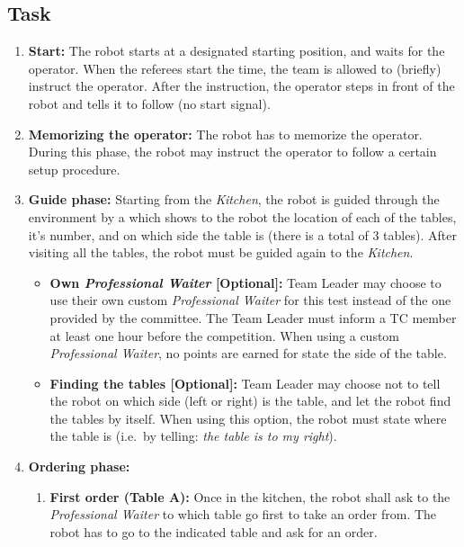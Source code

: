 \subsection{Task}
\begin{enumerate}
	\item \textbf{Start:} The robot starts at a designated starting position, and waits for the  operator. When the referees start the time, the team is allowed to (briefly) instruct the operator. After the instruction, the operator steps in front of the robot and tells it to follow (no start signal).

	\item \textbf{Memorizing the operator:} The robot has to memorize the operator. During this phase, the robot may instruct the operator to follow a certain setup procedure.

	\item \textbf{Guide phase:} Starting from the \textit{Kitchen}, the robot is guided through the environment by a  which shows to the robot the location of each of the tables, it's number, and on which side the table is (there is a total of 3 tables). After visiting all the tables, the robot must be guided again to the \textit{Kitchen}.
	\begin{itemize}
		\item \textbf{Own \textit{Professional Waiter} [Optional]:} Team Leader may choose to use their own custom \textit{Professional Waiter} for this test instead of the one provided by the committee. The Team Leader must inform a TC member at least one hour before the competition. When using a custom \textit{Professional Waiter}, no points are earned for state the side of the table.
		\item \textbf{Finding the tables [Optional]:} Team Leader may choose not to tell the robot on which side (left or right) is the table, and let the robot find the tables by itself. When using this option, the robot must state where the table is (i.e.~by telling: \textit{the table is to my right}).
	\end{itemize}

	\item \textbf{Ordering phase:}
	\begin{enumerate}
		\item \textbf{First order (Table A):} Once in the kitchen, the robot shall ask to the \textit{Professional Waiter} to which table go first to take an order from. The robot has to go to the indicated table and ask for an order.


\end{enumerate}
\end{enumerate}
